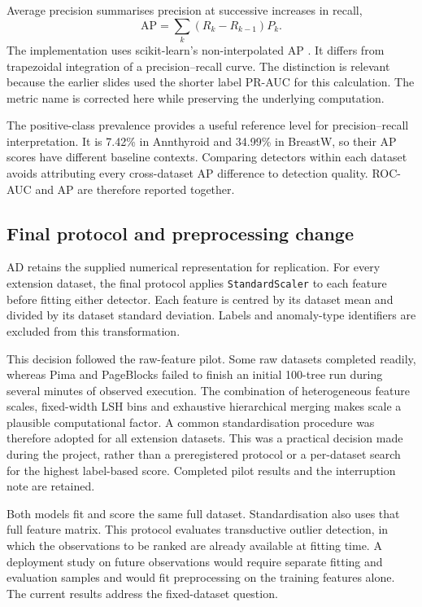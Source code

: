 \documentclass[11pt]{article}
\begin{document}
Average precision summarises precision at successive increases in recall,
\begin{equation}
\mathrm{AP}=\sum_k (R_k-R_{k-1})P_k.
\end{equation}
The implementation uses scikit-learn's non-interpolated AP \citep{sklearnap}. It differs from trapezoidal integration of a precision--recall curve. The distinction is relevant because the earlier slides used the shorter label PR-AUC for this calculation. The metric name is corrected here while preserving the underlying computation.

The positive-class prevalence provides a useful reference level for precision--recall interpretation. It is 7.42\% in Annthyroid and 34.99\% in BreastW, so their AP scores have different baseline contexts. Comparing detectors within each dataset avoids attributing every cross-dataset AP difference to detection quality. ROC-AUC and AP are therefore reported together.

\subsection{Final protocol and preprocessing change}
AD retains the supplied numerical representation for replication. For every extension dataset, the final protocol applies \texttt{StandardScaler} to each feature before fitting either detector. Each feature is centred by its dataset mean and divided by its dataset standard deviation. Labels and anomaly-type identifiers are excluded from this transformation.

This decision followed the raw-feature pilot. Some raw datasets completed readily, whereas Pima and PageBlocks failed to finish an initial 100-tree run during several minutes of observed execution. The combination of heterogeneous feature scales, fixed-width LSH bins and exhaustive hierarchical merging makes scale a plausible computational factor. A common standardisation procedure was therefore adopted for all extension datasets. This was a practical decision made during the project, rather than a preregistered protocol or a per-dataset search for the highest label-based score. Completed pilot results and the interruption note are retained.

Both models fit and score the same full dataset. Standardisation also uses that full feature matrix. This protocol evaluates transductive outlier detection, in which the observations to be ranked are already available at fitting time. A deployment study on future observations would require separate fitting and evaluation samples and would fit preprocessing on the training features alone. The current results address the fixed-dataset question.
\end{document}
